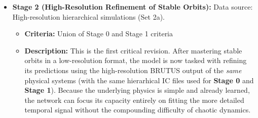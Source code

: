 \begin{itemize}
\begin{itemize}
        \item \textbf{Stage 1b: Moderately Stable (Angular Momentum Relaxed)}
        \begin{itemize}
            \item \textbf{Criteria:}
            \begin{itemize}
                \item $E < -0.5$
                \item $0.1 \leq \frac{L}{L_{\max}} < 0.5$
                \item $0.7 \leq Q \leq 1.3$
                \item $s_{\min} > 2$
            \end{itemize}
            \item \textbf{Description:} Systems with moderately reduced angular momentum (eccentric orbits) 
            but strong binding energy.
        \end{itemize}
    \end{itemize}
    
    
        
    \item \textbf{Stage 2 (High-Resolution Refinement of Stable Orbits):} 
    Data source: High-resolution hierarchical simulations (Set 2a).
    \begin{itemize}
        \item \textbf{Criteria:} Union of Stage 0 and Stage 1 criteria
        
        \item \textbf{Description:} 
        This is the first critical revision. 
        After mastering stable orbits in a low-resolution format, 
        the model is now tasked with refining its predictions using the high-resolution BRUTUS output of the \emph{same} physical 
        systems (with the same hierarhical IC files used for \textbf{Stage 0} and \textbf{Stage 1}). 
        Because the underlying physics is simple and already learned, 
        the network can focus its capacity entirely on fitting the more detailed temporal signal without the compounding 
        difficulty of chaotic dynamics. 
    \end{itemize}



\end{itemize}

